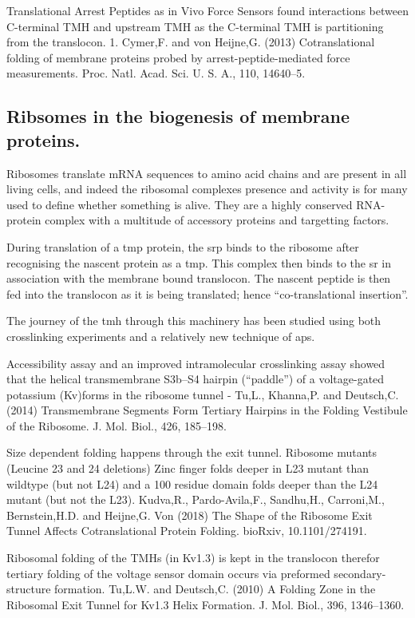 Translational Arrest Peptides as in Vivo Force Sensors found interactions between C-terminal TMH and upstream TMH as the C-terminal TMH is partitioning from the translocon. 1. Cymer,F. and von Heijne,G. (2013) Cotranslational folding of membrane proteins probed by arrest-peptide-mediated force measurements. Proc. Natl. Acad. Sci. U. S. A., 110, 14640–5.

\subsection{Ribsomes in the biogenesis of membrane proteins.}
Ribosomes translate mRNA sequences to amino acid chains and are present in all living cells, and indeed the ribosomal complexes presence and activity is for many used to define whether something is alive.
They are a highly conserved RNA-protein complex with a multitude of accessory proteins and targetting factors.

During translation of a \gls{tmp} protein, the \gls{srp} binds to the ribosome after recognising the nascent protein as a \gls{tmp}.
This complex then binds to the \gls{sr} in association with the membrane bound translocon.
The nascent peptide is then fed into the translocon as it is being translated; hence ``co-translational insertion''.

The journey of the \gls{tmh} through this machinery has been studied using both crosslinking experiments and a relatively new technique of \gls{ap}s.



Accessibility assay and an improved intramolecular crosslinking assay showed that the helical transmembrane S3b–S4 hairpin (“paddle”) of a voltage-gated potassium (Kv)forms in the ribosome tunnel - Tu,L., Khanna,P. and Deutsch,C. (2014) Transmembrane Segments Form Tertiary Hairpins in the Folding Vestibule of the Ribosome. J. Mol. Biol., 426, 185–198.

 Size dependent folding happens through the exit tunnel. Ribosome mutants (Leucine 23 and 24 deletions) Zinc finger folds deeper in L23 mutant than wildtype (but not L24) and a 100 residue domain folds deeper than the L24 mutant (but not the L23). Kudva,R., Pardo-Avila,F., Sandhu,H., Carroni,M., Bernstein,H.D. and Heijne,G. Von (2018) The Shape of the Ribosome Exit Tunnel Affects Cotranslational Protein Folding. bioRxiv, 10.1101/274191.

Ribosomal folding of the TMHs (in Kv1.3) is kept in the translocon therefor tertiary folding of the voltage sensor domain occurs via preformed secondary-structure formation. Tu,L.W. and Deutsch,C. (2010) A Folding Zone in the Ribosomal Exit Tunnel for Kv1.3 Helix Formation. J. Mol. Biol., 396, 1346–1360.


